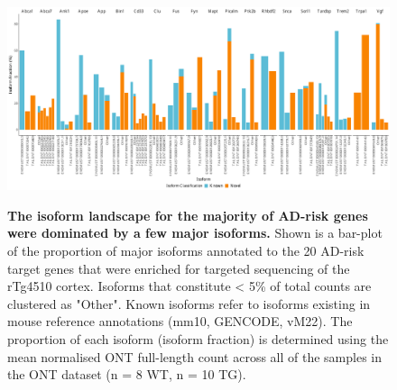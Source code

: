 \begin{landscape}
	\begin{figure}[htp]
		\centering
		\includegraphics[page=1,trim={0 1cm 0 0},scale =0.4]{Figures/GlobalIF.pdf}
		\captionsetup{width=1.5\textwidth}
		\label{fig:globalIF}
		\caption[Identification of major isoforms annotated to AD-risk target genes]%
		{\textbf{The isoform landscape for the majority of AD-risk genes were dominated by a few major isoforms.} Shown is a bar-plot of the proportion of major isoforms annotated to the 20 AD-risk target genes that were enriched for targeted sequencing of the rTg4510 cortex. Isoforms that constitute < 5\% of total counts are clustered as "Other". Known isoforms refer to isoforms existing in mouse reference annotations (mm10, GENCODE, vM22). The proportion of each isoform (isoform fraction) is determined using the mean normalised ONT full-length count across all of the samples in the ONT dataset (n = 8 WT, n = 10 TG). }   
	\end{figure}
\end{landscape}

\newpage
